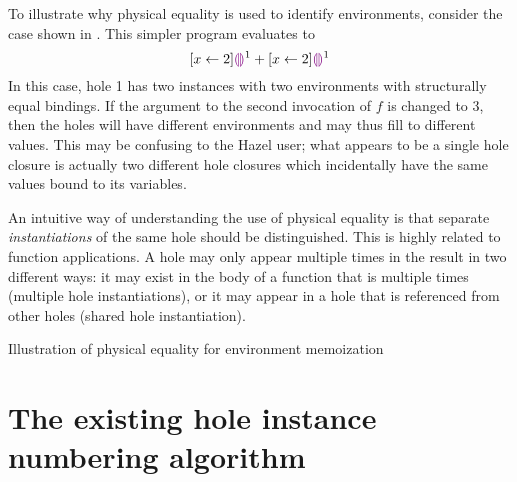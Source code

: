 To illustrate why physical equality is used to identify environments, consider the case shown in . This simpler program evaluates to \[
  [x\leftarrow 2]\textcolor{violet}{\llparenthesis}\textcolor{violet}{\rrparenthesis}^1 + [x\leftarrow 2]\textcolor{violet}{\llparenthesis}\textcolor{violet}{\rrparenthesis}^1
\] In this case, hole 1 has two instances with two environments with structurally equal bindings. If the argument to the second invocation of $f$ is changed to $3$, then the holes will have different environments and may thus fill to different values. This may be confusing to the Hazel user; what appears to be a single hole closure is actually two different hole closures which incidentally have the same values bound to its variables.

An intuitive way of understanding the use of physical equality is that separate \textit{instantiations} of the same hole should be distinguished. This is highly related to function applications. A hole may only appear multiple times in the result in two different ways: it may exist in the body of a function that is multiple times (multiple hole instantiations), or it may appear in a hole that is referenced from other holes (shared hole instantiation).

\begin{listing}
  \caption{Illustration of physical equality for environment memoization}
  \label{fig:physical-equality-illustration}
\end{listing}

\section{The existing hole instance numbering algorithm}
\label{sec:existing-hole-numbering}

